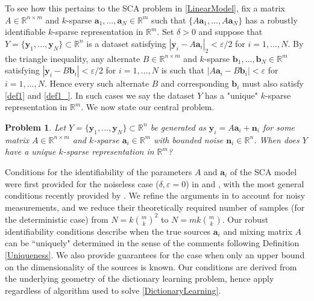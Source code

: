 \documentclass[journal, onecolumn]{IEEEtran}
\newtheorem{problem}{Problem}
\begin{document}
To see how this pertains to the SCA problem in \eqref{LinearModel}, fix a matrix $A \in \mathbb{R}^{n \times m}$ and $k$-sparse $\mathbf{a}_1, \ldots, \mathbf{a}_N \in \mathbb{R}^m$ such that $\{A\mathbf{a}_1, \ldots, A\mathbf{a}_N\}$ has a robustly identifiable $k$-sparse representation in $\mathbb{R}^m$. Set $\delta > 0$ and suppose that $Y = \{\mathbf{y}_1, \ldots, \mathbf{y}_N\} \subset \mathbb{R}^n$ is a dataset satisfying $|\mathbf{y}_i - A\mathbf{a}_i|_2 < \varepsilon/2$ for $i = 1, \ldots, N$. By the triangle inequality, any alternate $B \in \mathbb{R}^{n \times m}$ and $k$-sparse $\mathbf{b}_1, \ldots, \mathbf{b}_N \in \mathbb{R}^m$ satisfying $|\mathbf{y}_i - B\mathbf{b}_i| < \varepsilon/2$ for $i = 1, \ldots, N$ is such that $|A\mathbf{a}_i - B\mathbf{b}_i| < \varepsilon$ for $i = 1, \ldots, N$. Hence every such alternate $B$ and corresponding $\mathbf{b}_i$ must also satisfy \eqref{def1} and \eqref{def1_}. In such cases we say the dataset $Y$ has a "unique" $k$-sparse representation in $\mathbb{R}^m$. We now state our central problem.

\begin{problem}\label{DUTproblem}
Let $Y = \{\mathbf{y}_1, \ldots, \mathbf{y}_N \} \subset \mathbb{R}^n$ be generated as $\mathbf{y}_i = A\mathbf{a}_i  + \mathbf{n}_i$ for some matrix $A \in \mathbb{R}^{n \times m}$ and $k$-sparse $\mathbf{a}_i \in \mathbb{R}^m$ with bounded noise $\mathbf{n}_i \in \mathbb{R}^n$. When does $Y$ have a unique $k$-sparse representation in $\mathbb{R}^m$?
\end{problem}

Conditions for the identifiability of the parameters $A$ and $\mathbf{a}_i$ of the SCA model were first provided for the noiseless case ($\delta,\varepsilon = 0$) in \cite{Georgiev05} and \cite{Aharon06}, with the most general conditions recently provided by \cite{Hillar15}.
We refine the arguments in \cite{Hillar15} to account for noisy measurements, and we reduce their theoretically required number of samples (for the deterministic case) from $N=k{m \choose k}^2$ to $N = mk{m \choose k}$.  Our robust identifiability conditions describe when the true sources $\mathbf{a}_i$ and mixing matrix $A$ can be ``uniquely" determined in the sense of the comments following Definition \ref{Uniqueness}. We also provide guarantees for the case when only an upper bound on the dimensionality of the sources is known. Our conditions are derived from the underlying geometry of the dictionary learning problem, hence apply regardless of algorithm used to solve \eqref{DictionaryLearning}. 
\end{document}
